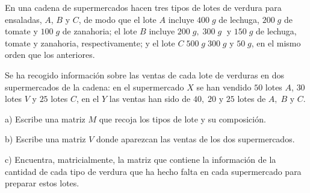 \begin{ejre}
	En una cadena de supermercados hacen tres tipos de lotes de verdura para ensaladas, $A$, $B$ y $C$, de modo que el lote $A$ incluye $400\; g$ de lechuga, $200\; g$ de tomate y $100\; g$ de zanahoria; el lote $B$ incluye $200\;g, \; 300\; g \; \text { y } 150\; g$ de lechuga, tomate y zanahoria, respectivamente; y el lote $C \; 500\; g\; 300\; g \text{ y } 50\; g$, en el mismo orden que los anteriores.  
	
	Se ha recogido información sobre las ventas de cada lote de verduras en dos supermercados de la cadena: en el supermercado $X$ se han vendido $50$ lotes $A$, $30$ lotes $V$ y $25$ lotes $C$, en el $Y$ las ventas han sido de $40,\; 20 \text{ y } 25$ lotes de $A, \; B \text{ y } C$.
	
	a) Escribe una matriz $M$ que recoja los tipos de lote y su composición.
	
	b) Escribe una matriz $V$ donde aparezcan las ventas de los dos supermercados.
	
	c) Encuentra, matricialmente, la matriz que contiene la información de la cantidad de cada tipo de verdura que ha hecho falta en cada supermercado para preparar estos lotes.
\end{ejre}


